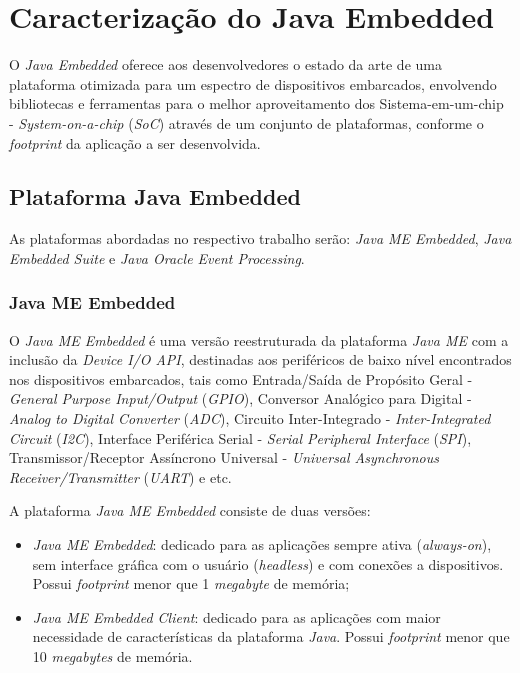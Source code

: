 %

\chapter{Caracterização do Java Embedded}

O \textit{Java Embedded} oferece aos desenvolvedores o estado da arte de uma
plataforma otimizada para um espectro de dispositivos embarcados, envolvendo
bibliotecas e ferramentas para o melhor aproveitamento dos Sistema-em-um-chip -
\textit{System-on-a-chip} (\textit{SoC}) através de um conjunto de plataformas,
conforme o \textit{footprint} da aplicação a ser desenvolvida.

\section{Plataforma Java Embedded}

As plataformas abordadas no respectivo trabalho serão: \textit{Java ME
  Embedded}, \textit{Java Embedded Suite} e \textit{Java Oracle Event
  Processing}.

\subsection{Java ME Embedded}

O \textit{Java ME Embedded} é uma versão reestruturada da plataforma
\textit{Java ME} com a inclusão da \textit{Device I/O API}, destinadas aos
periféricos de baixo nível encontrados nos dispositivos embarcados, tais como
Entrada/Saída de Propósito Geral - \textit{General Purpose Input/Output}
(\textit{GPIO}), Conversor Analógico para Digital - \textit{Analog to Digital
  Converter} (\textit{ADC}), Circuito Inter-Integrado -
\textit{Inter-Integrated Circuit} (\textit{I2C}), Interface Periférica Serial -
\textit{Serial Peripheral Interface} (\textit{SPI}), Transmissor/Receptor
Assíncrono Universal - \textit{Universal Asynchronous Receiver/Transmitter}
(\textit{UART}) e etc.

A plataforma \textit{Java ME Embedded} consiste de duas versões:

\begin{itemize}
    
    \item \textit{Java ME Embedded}: dedicado para as aplicações sempre ativa 
    (\textit{always-on}), sem interface gráfica com o usuário 
    (\textit{headless}) e com conexões a dispositivos. Possui 
    \textit{footprint} menor que 1 \textit{megabyte} de memória;
    
    \item \textit{Java ME Embedded Client}: dedicado para as aplicações com 
    maior necessidade de características da plataforma \textit{Java}. Possui 
    \textit{footprint} menor que 10 \textit{megabytes} de memória.
    
\end{itemize}

